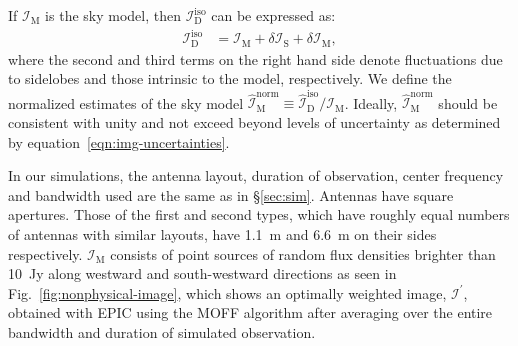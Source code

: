 \documentclass[a4paper,fleqn,usenatbib]{mnras}
\begin{document}
If $\mathcal{I}_\textrm{M}$ is the sky model, then $\mathcal{I}_\textrm{D}^\textrm{iso}$ can be expressed as:
\begin{align}\label{eqn:img-uncertainties}
  \mathcal{I}_\textrm{D}^\textrm{iso} &= \mathcal{I}_\textrm{M} + \delta\mathcal{I}_\textrm{S} + \delta\mathcal{I}_\textrm{M},
\end{align}
where the second and third terms on the right hand side denote fluctuations due to sidelobes and those intrinsic to the model, respectively. We define the normalized estimates of the sky model $\widehat{\mathcal{I}}_\textrm{M}^\textrm{norm} \equiv \widehat{\mathcal{I}}_\textrm{D}^\textrm{iso} / \mathcal{I}_\textrm{M}$. Ideally, $\widehat{\mathcal{I}}_\textrm{M}^\textrm{norm}$ should be consistent with unity and not exceed beyond levels of uncertainty as determined by equation~\ref{eqn:img-uncertainties}.

In our simulations, the antenna layout, duration of observation, center frequency and bandwidth used are the same as in \S\ref{sec:sim}. Antennas have square apertures. Those of the first and second types, which have roughly equal numbers of antennas with similar layouts, have 1.1~m and 6.6~m on their sides respectively. $\mathcal{I}_\textrm{M}$ consists of point sources of random flux densities brighter than 10~Jy along westward and south-westward directions as seen in Fig.~\ref{fig:nonphysical-image}, which shows an optimally weighted image, $\mathcal{I}^\prime$, obtained with EPIC using the MOFF algorithm after averaging over the entire bandwidth and duration of simulated observation. 
\end{document}
